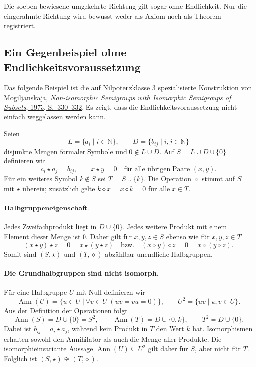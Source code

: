 \documentclass[main.tex]{subfiles}
\begin{document}
Die soeben bewiesene umgekehrte Richtung gilt sogar ohne Endlichkeit.  Nur die
eingerahmte Richtung wird bewusst weder als Axiom noch als Theorem registriert.

\subsection{Ein Gegenbeispiel ohne Endlichkeitsvoraussetzung}

Das folgende Beispiel ist die auf Nilpotenzklasse \(3\) spezialisierte
Konstruktion von
\href{https://doi.org/10.1007/BF02389140}%
  {Mogiljanskaja, \emph{Non-isomorphic Semigroups with Isomorphic
  Semigroups of Subsets}, 1973, S.~330--332}.
Es zeigt, dass die Endlichkeitsvoraussetzung nicht einfach weggelassen werden
kann.

Seien
\[
  L=\{a_i\mid i\in\mathbb N\},
  \qquad
  D=\{b_{ij}\mid i,j\in\mathbb N\}
\]
disjunkte Mengen formaler Symbole und \(0\notin L\cup D\).  Auf
\(S=L\mathbin{\dot\cup}D\mathbin{\dot\cup}\{0\}\) definieren wir
\[
  a_i\star a_j=b_{ij},
  \qquad
  x\star y=0
  \quad\text{für alle übrigen Paare }(x,y).
\]
Für ein weiteres Symbol \(k\notin S\) sei
\(T=S\mathbin{\dot\cup}\{k\}\).  Die Operation \(\diamond\) stimmt auf
\(S\) mit \(\star\) überein; zusätzlich gelte
\(k\diamond x=x\diamond k=0\) für alle \(x\in T\).

\paragraph{Halbgruppeneigenschaft.}
Jedes Zweifachprodukt liegt in \(D\cup\{0\}\).  Jedes weitere Produkt mit
einem Element dieser Menge ist \(0\).  Daher gilt für \(x,y,z\in S\) ebenso
wie für \(x,y,z\in T\)
\[
  (x\star y)\star z=0=x\star(y\star z)
  \quad\text{bzw.}\quad
  (x\diamond y)\diamond z=0=x\diamond(y\diamond z).
\]
Somit sind \((S,\star)\) und \((T,\diamond)\) abzählbar unendliche
Halbgruppen.

\paragraph{Die Grundhalbgruppen sind nicht isomorph.}
Für eine Halbgruppe \(U\) mit Null definieren wir
\[
  \operatorname{Ann}(U)
  =\{u\in U\mid \forall v\in U\;(uv=vu=0)\},
  \qquad
  U^2=\{uv\mid u,v\in U\}.
\]
Aus der Definition der Operationen folgt
\[
  \operatorname{Ann}(S)=D\cup\{0\}=S^2,
  \qquad
  \operatorname{Ann}(T)=D\cup\{0,k\},
  \qquad
  T^2=D\cup\{0\}.
\]
Dabei ist \(b_{ij}=a_i\star a_j\), während kein Produkt in \(T\) den Wert
\(k\) hat.  Isomorphismen erhalten sowohl den Annihilator als auch die Menge
aller Produkte.  Die isomorphieinvariante Aussage
\(\operatorname{Ann}(U)\subseteq U^2\) gilt daher für \(S\), aber nicht für
\(T\).  Folglich ist \((S,\star)\not\cong(T,\diamond)\).
\end{document}
